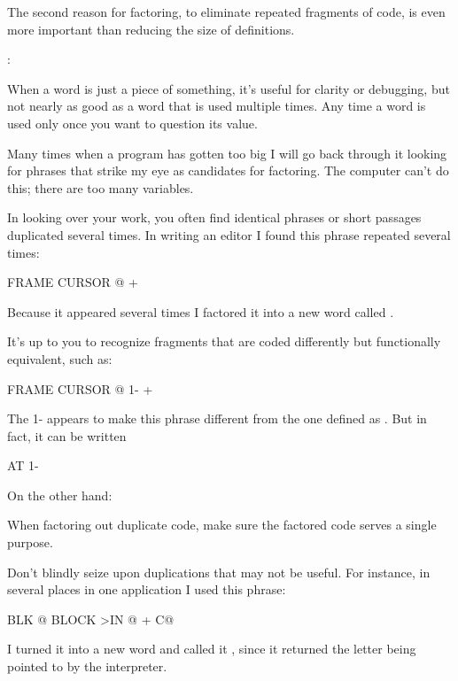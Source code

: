 \begin{tip}
The second reason for factoring, to eliminate repeated fragments of
code, is even more important than reducing the size of definitions.
\end{tip}

\begin{interview}
:

\begin{tfquot}
When a word is just a piece of something, it's useful for clarity or
debugging, but not nearly as good as a word that is used multiple
times. Any time a word is used only once you want to question its
value.

Many times when a program has gotten too big I will go back through it
looking for phrases that strike my eye as candidates for factoring.
The computer can't do this; there are too many variables.
\end{tfquot}
\end{interview}
In looking over your work, you often find identical phrases or short
passages duplicated several times. In writing an editor I found this
phrase repeated several times:

\begin{Code}
FRAME  CURSOR @ +
\end{Code}
Because it appeared several times I factored it into a new word called
.

It's up to you to recognize fragments that are coded differently but
functionally equivalent, such as:

\begin{Code}
FRAME  CURSOR @ 1-  +
\end{Code}
The 1- appears to make this phrase different from the one defined as
. But in fact, it can be written

\begin{Code}
AT 1-
\end{Code}
On the other hand:

\begin{tip}
When factoring out duplicate code, make sure the factored code serves
a single purpose.
\end{tip}
Don't blindly seize upon duplications that may not be useful. For
instance, in several places in one application I used this phrase:

\begin{Code}
BLK @ BLOCK  >IN @ +  C@
\end{Code}
I turned it into a new word and called it , since it
returned the letter being pointed to by the interpreter.

